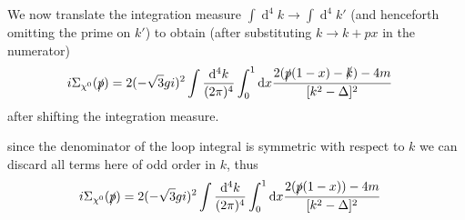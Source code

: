 \documentclass[11pt]{article}
\def\sp{\slashed{p}}
\def\sk{\slashed{k}}
\def\cn{\chi^0}
\def\gn{\gamma^{\nu}}
\def\km{k_{\mu}}
\def\kn{k_{\nu}}
\renewcommand{\d}{\ensuremath{\operatorname{d}\!}}
\def\kmpm{k^{\mu}p_{\mu}}
\begin{document}

We now translate the integration measure $\int \d^4k\rightarrow\int \d^4k'$ (and henceforth omitting the prime on $k'$) to obtain (after substituting $k\rightarrow k+px$ in the numerator)
\begin{align}
i\Sigma_{\cn}(\slashed{p})&= 2(-\sqrt{3}gi)^2 \int \frac{\d^4k}{(2\pi)^4}\int_0^1 \d x \frac{2(\sp(1-x)-\sk )-4m}{[ k^2-\Delta]^2}
\end{align}
after shifting the integration measure.

%


since the denominator of the loop integral is symmetric with respect to $k$ we can discard all terms here of odd order in $k$, thus
\begin{align}
i\Sigma_{\cn}(\slashed{p})&= 2(-\sqrt{3}gi)^2 \int \frac{\d^4k}{(2\pi)^4}\int_0^1 \d x \frac{2(\sp(1-x))-4m}{[ k^2-\Delta]^2}
\end{align}



\end{document}
